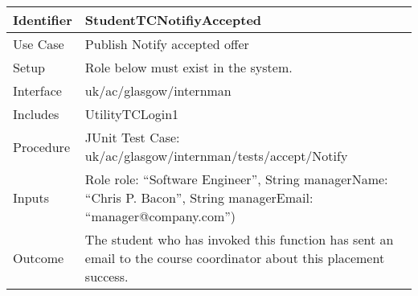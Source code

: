 \vspace{2em}
\begin{tabularx}{\textwidth}{|T|L|}
\hline
Identifier & StudentTCNotifiyAccepted\\
\hline
Use Case & Publish Notify accepted offer\\
\hline
Setup & Role below must exist in the system.\\
\hline
Interface & uk/ac/glasgow/internman\\
\hline
Includes & UtilityTCLogin1\\
\hline
Procedure & JUnit Test Case: uk/ac/glasgow/internman/tests/accept/Notify\\
\hline
Inputs & Role role: ``Software Engineer'', String managerName: ``Chris
P. Bacon'', String managerEmail: ``manager@company.com'')\\
\hline
Outcome & The student who has invoked this function has sent an email
to the course coordinator about this placement success.\\
\hline
\end{tabularx}
